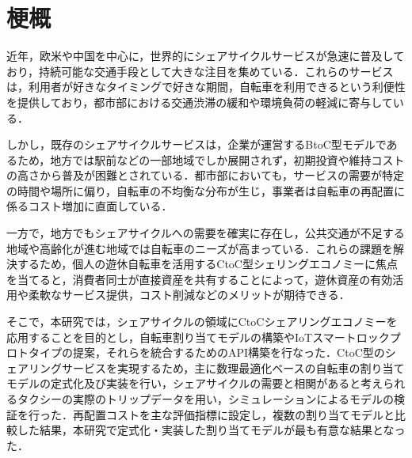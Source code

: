 \section*{梗概}
    \par 近年，欧米や中国を中心に，世界的にシェアサイクルサービスが急速に普及しており，持続可能な交通手段として大きな注目を集めている．これらのサービスは，利用者が好きなタイミングで好きな期間，自転車を利用できるという利便性を提供しており，都市部における交通渋滞の緩和や環境負荷の軽減に寄与している．
    \par しかし，既存のシェアサイクルサービスは，企業が運営するBtoC型モデルであるため，地方では駅前などの一部地域でしか展開されず，初期投資や維持コストの高さから普及が困難とされている．都市部においても，サービスの需要が特定の時間や場所に偏り，自転車の不均衡な分布が生じ，事業者は自転車の再配置に係るコスト増加に直面している．
    \par 一方で，地方でもシェアサイクルへの需要を確実に存在し，公共交通が不足する地域や高齢化が進む地域では自転車のニーズが高まっている．これらの課題を解決するため，個人の遊休自転車を活用するCtoC型シェリングエコノミーに焦点を当てると，消費者同士が直接資産を共有することによって，遊休資産の有効活用や柔軟なサービス提供，コスト削減などのメリットが期待できる．
    \par そこで，本研究では，シェアサイクルの領域にCtoCシェアリングエコノミーを応用することを目的とし，自転車割り当てモデルの構築やIoTスマートロックプロトタイプの提案，それらを統合するためのAPI構築を行なった．CtoC型のシェアリングサービスを実現するため，主に数理最適化ベースの自転車の割り当てモデルの定式化及び実装を行い，シェアサイクルの需要と相関があると考えられるタクシーの実際のトリップデータを用い，シミュレーションによるモデルの検証を行った．再配置コストを主な評価指標に設定し，複数の割り当てモデルと比較した結果，本研究で定式化・実装した割り当てモデルが最も有意な結果となった．
